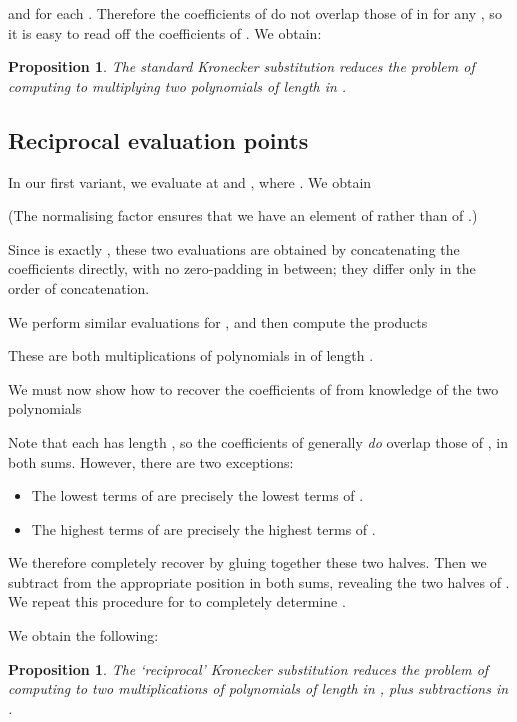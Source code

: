 \documentclass{amsart}
\newtheorem{prop}[thm]{Proposition}
\theoremstyle{definition}
\theoremstyle{remark}
\begin{document}
and  for each . Therefore the coefficients of  do not overlap those of  in  for any , so it is easy to read off the coefficients of . We obtain:

\begin{prop}
\label{prop:polynomial-std-ks}
The standard Kronecker substitution reduces the problem of computing  to multiplying two polynomials of length  in .
\end{prop}


\subsection{Reciprocal evaluation points}
\label{sec:polynomial-recip}

In our first variant, we evaluate at  and , where . We obtain

(The normalising factor  ensures that we have an element of  rather than of .)

Since  is exactly , these two evaluations are obtained by concatenating the coefficients  directly, with no zero-padding in between; they differ only in the order of concatenation.

We perform similar evaluations for , and then compute the products

These are both multiplications of polynomials in  of length .

We must now show how to recover the coefficients of  from knowledge of the two polynomials

Note that each  has length , so the coefficients of  generally \emph{do} overlap those of , in both sums. However, there are two exceptions:
\begin{itemize}
\item The lowest  terms of  are precisely the lowest  terms of .
\item The highest  terms of  are precisely the highest  terms of .
\end{itemize}
We therefore completely recover  by gluing together these two halves. Then we subtract  from the appropriate position in both sums, revealing the two halves of . We repeat this procedure for  to completely determine .

We obtain the following:
\begin{prop}
\label{prop:polynomial-recip-ks}
The `reciprocal' Kronecker substitution reduces the problem of computing  to two multiplications of polynomials of length  in , plus  subtractions in .
\end{prop}
\end{document}
